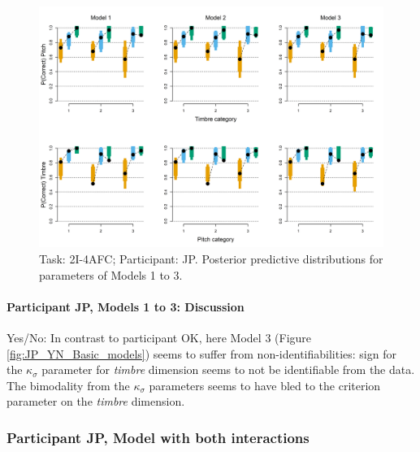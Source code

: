\documentclass{article}\usepackage{knitr}
\begin{document}
\begin{figure}[H]
\centering
\includegraphics[scale=0.75, angle = 270]{Analysis_of_Human_Data/JP_AFC_post_pred}
\caption{Task: 2I-4AFC; Participant: JP. Posterior predictive distributions for parameters of Models 1 to 3.}
\label{fig:JP_AFC_post_pred}
\end{figure}

\paragraph{Participant JP, Models 1 to 3: Discussion}

Yes/No: In contrast to participant OK, here Model 3 (Figure \ref{fig:JP_YN_Basic_models}) seems to suffer from non-identifiabilities: sign for the $\kappa_{\sigma}$ parameter for \textit{timbre} dimension seems to not be identifiable from the data. The bimodality from the $\kappa_{\sigma}$ parameters seems to have bled to the criterion parameter on the \textit{timbre} dimension.

\subsubsection{Participant JP, Model with both interactions}
\end{document}
